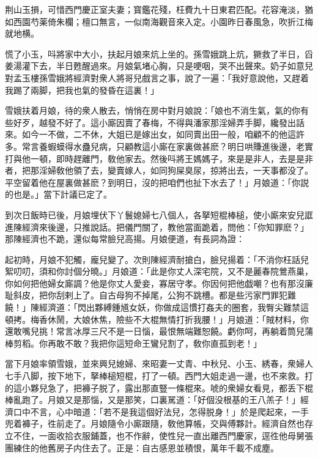 \begin{myquote}
荆山玉損，可惜西門慶正室夫妻；寳鑑花殘，枉費九十日東君匹配。花容淹淡，猶如西園芍薬倚朱欄；檀口無言，一似南海觀音來入定。小園昨日春風急，吹折江梅就地横。
\end{myquote}

慌了小玉，呌將家中大小，扶起月娘來炕上坐的。孫雪娥跳上炕，獗救了半日，舀姜湯灌下去，半日甦醒過來。月娘氣堵心胸，只是哽咽，哭不出聲來。奶子如意兒對孟玉樓孫雪娥將經濟對衆人將哥兒戲言之事，說了一遍：「我好意說他，又趕着我踢了兩脚，把我也氣的發昏在這裏！」

雪娥扶着月娘，待的衆人散去，悄悄在房中對月娘說：「娘也不消生氣，氣的你有些好歹，越發不好了。這小廝因賣了春梅，不得與潘家那淫婦弄手脚，纔發出話來。如今一不做，二不休，大姐已是嫁出女，如同賣出田一般，咱顧不的他這許多。常言養蝦蟆得水蠱兒病，只顧教這小廝在家裏做甚麽？明日哄賺進後邊，老實打與他一頓，即時趕離門，敎他家去。然後呌將王媽媽子，來是是非人，去是是非者，把那淫婦敎他領了去，變賣嫁人，如同狗屎臭尿，掠將出去，一天事都没了。平空留着他在屋裏做甚麽？到明日，沒的把咱們也扯下水去了！」月娘道：「你説的也是。」當下計議已定了。

到次日飯時已後，月娘埋伏下丫鬟媳婦七八個人，各拏短棍棒槌，使小廝來安兒誆進陳經濟來後邊，只推說話。把儀門關了，教他當面跪着，問他：「你知罪麽？」那陳經濟也不跪，還似每常臉兒高揚。月娘便道，有長詞為證：

\begin{myquote}
起初時，月娘不犯觸，龐兒變了。次則陳經濟耐搶白，臉兒揚着：「不消你枉話兒絮叨叨，須和你討個分曉。」月娘道：「此是你丈人深宅院，又不是麗春院鶯燕巢，你如何把他婦女廝調？他是你丈人愛妾，寡居守孝。你因何把他戯嘲？也有那沒廉耻斜皮，把你刮剌上了。自古母狗不掉尾，公狗不跳槽。都是些污家門罪犯難饒！」陳經濟道：「閃出夥縛鍾馗女妖，你做成這慣打姦夫的圈套，我臀尖難禁這頓拷。梅香休鬧，大娘休焦，險些不大棍無情打折我腰！」月娘道：「賊材料，你還敢嘴兒挑！常言冰厚三尺不是一日惱，最恨無端難恕饒。虧你呵，再躺着筒兒蒲棒剪稻。你再敢不敢？我把你這短命王鸞兒割了，敎你直孤到老！」
\end{myquote}

當下月娘率領雪娥，並來興兒媳婦、來昭妻一丈青、中秋兒、小玉、綉春，衆婦人七手八脚，按下地下，拏棒槌短棍，打了一頓。西門大姐走過一邊，也不來救。打的這小夥兒急了，把褲子脱了，露出那直豎一條棍來。唬的衆婦女看見，都丢下棍棒亂跑了。月娘又是那惱，又是那笑，口裏駡道：「好個没根基的王八羔子！」經濟口中不言，心中暗道：「若不是我這個好法兒，怎得脱身！」於是爬起來，一手兜着褲子，徃前走了。月娘隨令小廝跟隨，敎他算帳，交與傅夥計。經濟自然也存立不住，一面收拾衣服鋪蓋，也不作辭，使性兒一直出離西門慶家，逕徃他母舅張團練住的他舊房子内住去了。正是：自古感恩並積恨，萬年千載不成塵。

